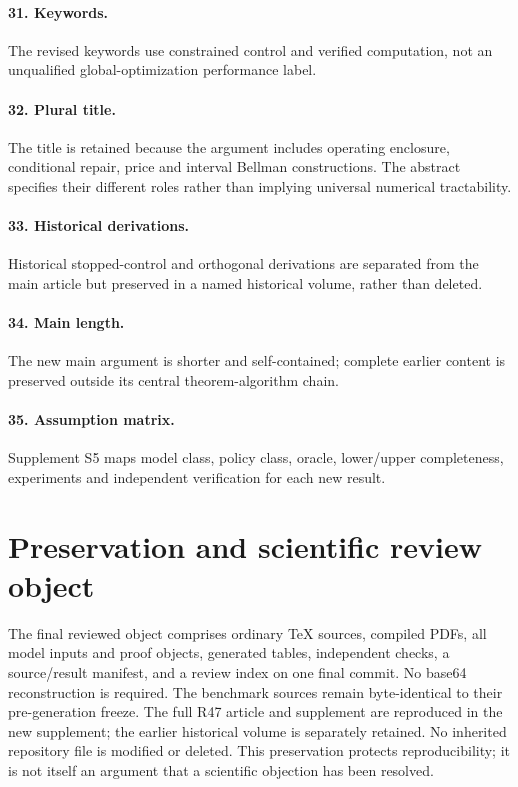 \paragraph{31. Keywords.} The revised keywords use constrained control and verified computation, not an unqualified global-optimization performance label.

\paragraph{32. Plural title.} The title is retained because the argument includes operating enclosure, conditional repair, price and interval Bellman constructions. The abstract specifies their different roles rather than implying universal numerical tractability.

\paragraph{33. Historical derivations.} Historical stopped-control and orthogonal derivations are separated from the main article but preserved in a named historical volume, rather than deleted.

\paragraph{34. Main length.} The new main argument is shorter and self-contained; complete earlier content is preserved outside its central theorem-algorithm chain.

\paragraph{35. Assumption matrix.} Supplement S5 maps model class, policy class, oracle, lower/upper completeness, experiments and independent verification for each new result.

\section{Preservation and scientific review object}
The final reviewed object comprises ordinary TeX sources, compiled PDFs, all model inputs and proof objects, generated tables, independent checks, a source/result manifest, and a review index on one final commit. No base64 reconstruction is required. The benchmark sources remain byte-identical to their pre-generation freeze. The full R47 article and supplement are reproduced in the new supplement; the earlier historical volume is separately retained. No inherited repository file is modified or deleted. This preservation protects reproducibility; it is not itself an argument that a scientific objection has been resolved.

